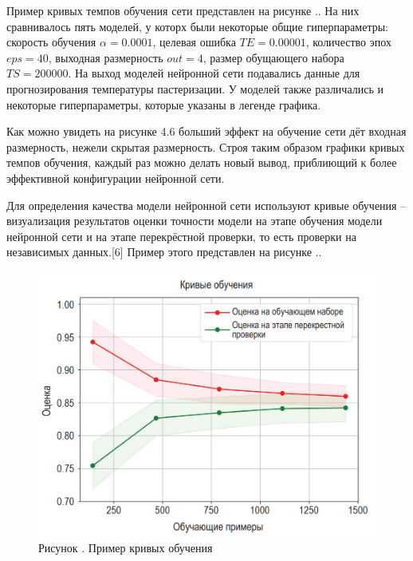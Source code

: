 {  \par \redline Пример кривых темпов обучения сети представлен на рисунке \thechaptercntr .\theimagecntr. На них сравнивалось пять моделей, у которх были некоторые общие гиперпараметры: скорость обучения $\alpha = 0.0001$, целевая ошибка $TE = 0.00001$, количество эпох $eps = 40$, выходная размерность $out = 4$, размер обущающего набора $TS = 200000$. На выход моделей нейронной сети подавались данные для прогнозирования температуры пастеризации. У моделей также различались и некоторые гиперпараметры, которые указаны в легенде графика.

  \par \redline Как можно увидеть на рисунке 4.6 больший эффект на обучение сети дёт входная размерность, нежели скрытая размерность. Строя таким образом графики кривых темпов обучения, каждый раз можно делать новый вывод, приблиющий к более эффективной конфигурации нейронной сети. 

  \par \redline Для определения качества модели нейронной сети используют кривые обучения {--} визуализация результатов оценки точности модели на этапе обучения модели нейронной сети и на этапе перекрёстной проверки, то есть проверки на независимых данных.[6] Пример этого представлен на рисунке \thechaptercntr .\theimagecntr.

  \begin{figure}[H]
    \centering
    \def\svgwidth{\textwidth}
    \includegraphics[scale=0.5]{images/CL.png}
    \caption*{\gostFont Рисунок \thechaptercntr .\theimagecntr \spc {--} Пример кривых обучения}
    \label{fig:CL}
  \end{figure} \addtocounter{imagecntr}{1}

}
